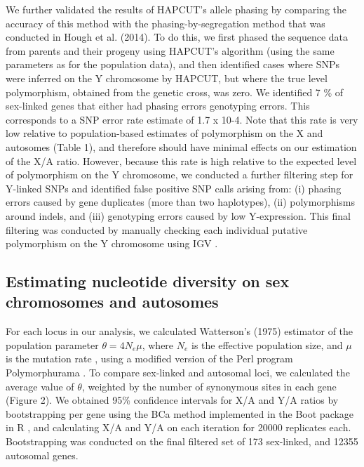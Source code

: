 \documentclass[9pt,twocolumn,twoside]{gsajnl}
\begin{document}
We further validated the results of HAPCUT’s allele phasing by comparing the accuracy of this method with the phasing-by-segregation method that was conducted in Hough et al. (2014). To do this, we first phased the sequence data from parents and their progeny using HAPCUT’s algorithm (using the same parameters as for the population data), and then identified cases where SNPs were inferred on the Y chromosome by HAPCUT, but where the true level polymorphism, obtained from the genetic cross, was zero. We identified 7 \% of sex-linked genes that either had phasing errors genotyping errors. This corresponds to a SNP error rate estimate of 1.7 x 10-4. Note that this rate is very low relative to population-based estimates of polymorphism on the X and autosomes (Table 1), and therefore should have minimal effects on our estimation of the X/A ratio. However, because this rate is high relative to the expected level of polymorphism on the Y chromosome, we conducted a further filtering step for Y-linked SNPs and identified false positive SNP calls arising from: (i) phasing errors caused by gene duplicates (more than two haplotypes), (ii) polymorphisms around indels, and (iii) genotyping errors caused by low Y-expression. This final filtering was conducted by manually checking each individual putative polymorphism on the Y chromosome using IGV \citep{robinson2011integrative}.

\subsection*{Estimating nucleotide diversity on sex chromosomes and autosomes}
For each locus in our analysis, we calculated Watterson’s (1975) estimator of the population parameter $\theta=4N_{e}\mu$, where $N_{e}$ is the effective population size, and $\mu$ is the mutation rate \citep{watterson1975}, using a modified version of the Perl program Polymorphurama \citep{bachtrog2006}. To compare sex-linked and autosomal loci, we calculated the average value of $\theta$, weighted by the number of synonymous sites in each gene (\X Figure 2). We obtained 95\% confidence intervals for X/A and Y/A ratios by bootstrapping per gene using the BCa method \citep{efron1994} implemented in the Boot package in R \citep{canty2012boot}, and calculating X/A and Y/A on each iteration for 20000 replicates each. Bootstrapping was conducted on the final filtered set of 173 sex-linked, and 12355 autosomal genes.
\end{document}
